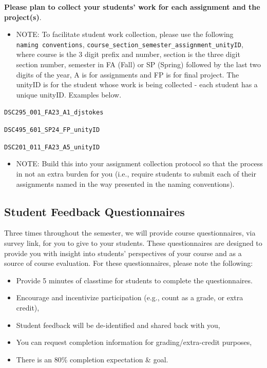 \documentclass[
]{book}
\providecommand{\tightlist}{%
  \setlength{\itemsep}{0pt}\setlength{\parskip}{0pt}}
\begin{document}
{ \textbf{Please plan to collect your students' work for each assignment and the project(s)}. }

\begin{itemize}
\tightlist
\item
  NOTE: To facilitate student work collection, please use the following \texttt{naming\ conventions}, \texttt{course\_section\_semester\_assignment\_unityID}, where course is the 3 digit prefix and number, section is the three digit section number, semester in FA (Fall) or SP (Spring) followed by the last two digits of the year, A is for assignments and FP is for final project. The unityID is for the student whose work is being collected - each student has a unique unityID. Examples below.
\end{itemize}

\texttt{DSC295\_001\_FA23\_A1\_djstokes}

\texttt{DSC495\_601\_SP24\_FP\_unityID}

\texttt{DSC201\_011\_FA23\_A5\_unityID}

\begin{itemize}
\tightlist
\item
  NOTE: Build this into your assignment collection protocol so that the process in not an extra burden for you (i.e., require students to submit each of their assignments named in the way presented in the naming conventions).
\end{itemize}

\subsection{Student Feedback Questionnaires}\label{student-feedback-questionnaires}

Three times throughout the semester, we will provide course questionnaires, via survey link, for you to give to your students. These questionnaires are designed to provide you with insight into students' perspectives of your course and as a source of course evaluation. For these questionnaires, please note the following:

\begin{itemize}
\tightlist
\item
  Provide 5 minutes of classtime for students to complete the questionnaires.
\item
  Encourage and incentivize participation (e.g., count as a grade, or extra credit),
\item
  Student feedback will be de-identified and shared back with you,
\item
  You can request completion information for grading/extra-credit purposes,
\item
  There is an 80\% completion expectation \& goal.
\end{itemize}
\end{document}
